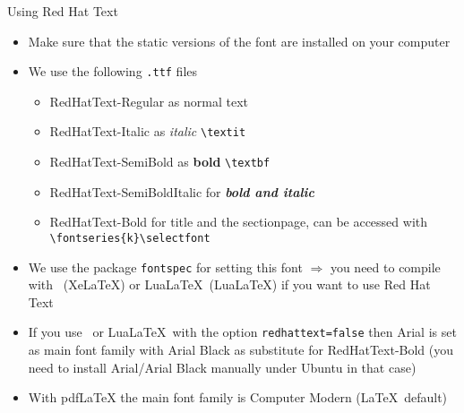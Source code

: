 \begin{frame}[minimal]{Using Red Hat Text}
	\label{remarks-font}
	\begin{itemize}
		\item Make sure that the static versions of the font are installed on your computer
		\item We use the following \texttt{.ttf} files \begin{itemize}
			\item RedHatText-Regular as normal text
			\item RedHatText-Italic as \textit{italic} \texttt{\textbackslash textit}
			\item RedHatText-SemiBold as \textbf{bold} \texttt{\textbackslash textbf}
			\item RedHatText-SemiBoldItalic for \textbf{\textit{bold and italic}}
			\item RedHatText-Bold for {\selectfont title and the sectionpage}, can be accessed with \texttt{\textbackslash fontseries\{k\}\textbackslash selectfont} 
		\end{itemize}
		\item We use the package \texttt{fontspec} for setting this font $\Rightarrow$ you need to compile with \XeLaTeX\ (XeLaTeX) or Lua\LaTeX\ (LuaLaTeX) if you want to use Red Hat Text
		\item If you use \XeLaTeX\ or Lua\LaTeX\ with the option \texttt{redhattext=false} then Arial is set as main font family with Arial Black as substitute for {\selectfont RedHatText-Bold} (you need to install Arial/Arial Black manually under Ubuntu in that case)
		\item With pdfLaTeX the main font family is Computer Modern (\LaTeX\ default)
	\end{itemize}
\end{frame}



